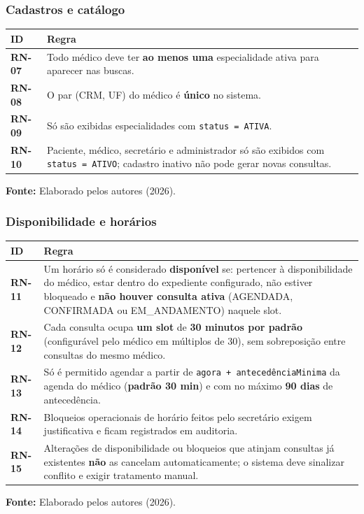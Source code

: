 \documentclass[12pt,a4paper]{article}
\newcommand{\fonte}[1]{%
  \par\vspace{2pt}%
  {\footnotesize\raggedright\textbf{Fonte:} #1\par}%
}
\begin{document}
\subsubsection{Cadastros e catálogo}

\begin{table}[H]
\centering
{\footnotesize
\begin{tabularx}{\textwidth}{@{}>{\raggedright\arraybackslash}p{1.8cm}>{\raggedright\arraybackslash}X@{}}
\toprule
ID & Regra \\
\midrule
\textbf{RN-07} & Todo médico deve ter \textbf{ao menos uma} especialidade ativa para aparecer nas buscas. \\
\textbf{RN-08} & O par (CRM, UF) do médico é \textbf{único} no sistema. \\
\textbf{RN-09} & Só são exibidas especialidades com \texttt{status = ATIVA}. \\
\textbf{RN-10} & Paciente, médico, secretário e administrador só são exibidos com \texttt{status = ATIVO}; cadastro inativo não pode gerar novas consultas. \\
\bottomrule
\end{tabularx}
}
\fonte{Elaborado pelos autores (2026).}
\end{table}

\subsubsection{Disponibilidade e horários}

\begin{table}[H]
\centering
{\footnotesize
\begin{tabularx}{\textwidth}{@{}>{\raggedright\arraybackslash}p{1.8cm}>{\raggedright\arraybackslash}X@{}}
\toprule
ID & Regra \\
\midrule
\textbf{RN-11} & Um horário só é considerado \textbf{disponível} se: pertencer à disponibilidade do médico, estar dentro do expediente configurado, não estiver bloqueado e \textbf{não houver consulta ativa} (AGENDADA, CONFIRMADA ou EM\_ANDAMENTO) naquele slot. \\
\textbf{RN-12} & Cada consulta ocupa \textbf{um slot} de \textbf{30 minutos por padrão} (configurável pelo médico em múltiplos de 30), sem sobreposição entre consultas do mesmo médico. \\
\textbf{RN-13} & Só é permitido agendar a partir de \texttt{agora + antecedênciaMinima} da agenda do médico (\textbf{padrão 30 min}) e com no máximo \textbf{90 dias} de antecedência. \\
\textbf{RN-14} & Bloqueios operacionais de horário feitos pelo secretário exigem justificativa e ficam registrados em auditoria. \\
\textbf{RN-15} & Alterações de disponibilidade ou bloqueios que atinjam consultas já existentes \textbf{não} as cancelam automaticamente; o sistema deve sinalizar conflito e exigir tratamento manual. \\
\bottomrule
\end{tabularx}
}
\fonte{Elaborado pelos autores (2026).}
\end{table}
\end{document}
